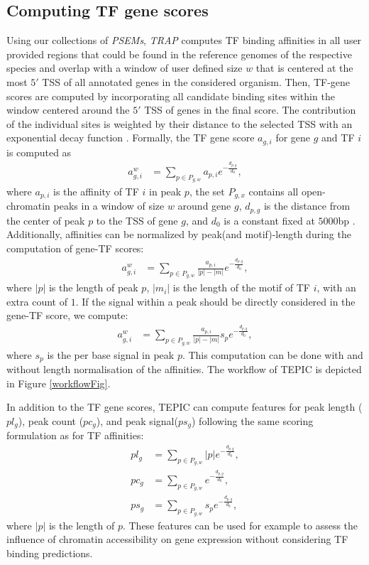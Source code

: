 \documentclass{article}
\begin{document}
\subsection{Computing TF gene scores}
Using our collections of \textit{PSEMs}, \textit{TRAP} computes TF binding affinities in all user provided regions 
that could be found in the reference genomes of the respective species and 
overlap with a window of user defined size $w$ that is centered at the most $5'$ TSS of all annotated genes in the considered organism. 
Then, TF-gene scores are computed by incorporating all candidate binding sites within the window centered around the $5'$ TSS of genes in the final score. 
The contribution of the individual sites is weighted by their distance to the selected TSS with an exponential decay function \cite{pmid19995984}.
Formally, the TF gene score $a_{g,i}$ for gene $g$ and TF $i$ is computed as
\begin{align}
a_{g,i}^{w}&=\sum_{p \in P_{g,w}} a_{p,i}e^{-\frac{d_{p,g}}{d_0}},
\end{align}
where $a_{p,i}$ is the affinity of TF $i$ in peak $p$, the set $P_{g,x}$ contains all open-chromatin peaks
in a window of size $w$ around gene $g$, $d_{p,g}$ is the distance from the center of peak $p$ to the TSS of gene $g$, and $d_0$ is a constant fixed at $5000$bp \cite{pmid19995984}.
Additionally, affinities can be normalized by peak(and motif)-length during the computation of gene-TF scores:
\begin{align}
a_{g,i}^{w}&=\sum_{p \in P_{g,w}} {\frac{a_{p,i}}{|p|-|m|}e^{-\frac{d_{p,g}}{d_0}}},
\end{align}
where $|p|$ is the length of peak $p$, $|m_i|$ is
the length of the motif of TF $i$, with an extra count of $1$.
If the signal within a peak should be directly considered in the gene-TF score, we compute:
\begin{align}
a_{g,i}^{w}&=\sum_{p \in P_{g,w}} {\frac{a_{p,i}}{|p|-|m|}s_{p}e^{-\frac{d_{p,g}}{d_0}}},
\end{align}
where $s_p$ is the per base signal in peak $p$. This computation can be done with and without length normalisation of the affinities. 
The workflow of TEPIC is depicted in Figure \ref{workflowFig}.

In addition to the TF gene scores, TEPIC can compute features for peak length ($pl_g$), peak count ($pc_g$), and peak signal($ps_g$) following the same scoring formulation as for
TF affinities:
\begin{align}
pl_g&=\sum_{p \in P_{g,w}}|p|e^{-\frac{d_{p,g}}{d_0}}, \\
pc_g&=\sum_{p \in P_{g,w}}e^{-\frac{d_{p,g}}{d_0}}, \\
ps_g&=\sum_{p \in P_{g,w}}s_{p}e^{-\frac{d_{p,g}}{d_0}},
\end{align}
where $|p|$ is the length of $p$. These features can be used for example to assess the influence of chromatin accessibility on gene expression without considering TF binding predictions. 
\end{document}
